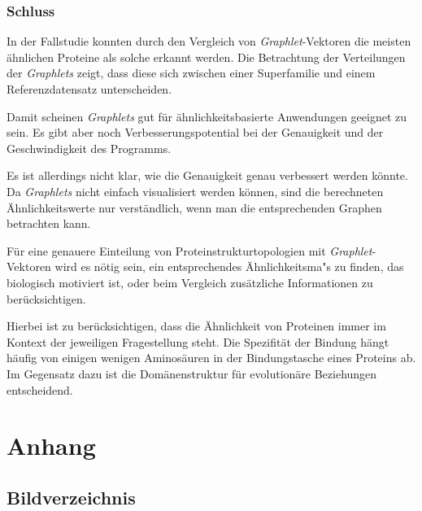 \documentclass{report}
\begin{document}
\subsection{Schluss}

In der Fallstudie konnten durch den Vergleich von \textit{Graphlet}-Vektoren die meisten \"ahnlichen Proteine als solche erkannt werden. Die Betrachtung der Verteilungen der \textit{Graphlets} zeigt, dass diese sich zwischen einer Superfamilie und einem Referenzdatensatz unterscheiden.

Damit scheinen \textit{Graphlets} gut f\"ur \"ahnlichkeitsbasierte Anwendungen geeignet zu sein. Es gibt aber noch Verbesserungspotential bei der Genauigkeit und der Geschwindigkeit des Programms.

Es ist allerdings nicht klar, wie die Genauigkeit genau verbessert werden k\"onnte. Da \textit{Graphlets} nicht einfach visualisiert werden k\"onnen, sind die berechneten \"Ahnlichkeitswerte nur verst\"andlich, wenn man die entsprechenden Graphen betrachten kann.

F\"ur eine genauere Einteilung von Proteinstrukturtopologien mit \textit{Graphlet}-Vektoren wird es n\"otig sein, ein entsprechendes \"Ahnlichkeitsma"s zu finden, das biologisch motiviert ist, oder beim Vergleich zus\"atzliche Informationen zu ber\"ucksichtigen. 

Hierbei ist zu ber\"ucksichtigen, dass die \"Ahnlichkeit von Proteinen immer im Kontext der jeweiligen Fragestellung steht. Die Spezifit\"at der Bindung h\"angt h\"aufig von einigen wenigen Aminos\"auren in der Bindungstasche eines Proteins ab. Im Gegensatz dazu ist die Dom\"anenstruktur f\"ur evolution\"are Beziehungen entscheidend.



\chapter{Anhang}


\section{Bildverzeichnis}
\end{document}
